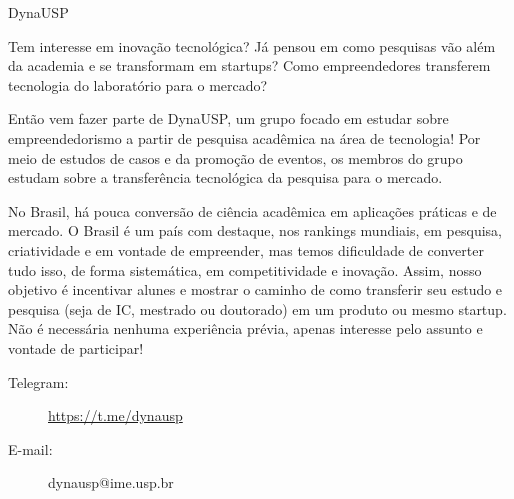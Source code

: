 \begin{subsecao}{DynaUSP}


Tem interesse em inovação tecnológica? Já pensou em como pesquisas
vão além da academia e se transformam em startups? Como empreendedores
transferem tecnologia do laboratório para o mercado? 

Então vem fazer parte de DynaUSP, um grupo focado em estudar sobre
empreendedorismo a partir de pesquisa acadêmica na área de tecnologia!
Por meio de estudos de casos e da promoção de eventos, os membros do grupo
estudam sobre a transferência tecnológica da pesquisa para o mercado.

No Brasil, há pouca conversão de ciência acadêmica em aplicações práticas e
de mercado. O Brasil é um país com destaque, nos rankings mundiais, em pesquisa,
criatividade e em vontade de empreender, mas temos dificuldade de converter tudo
isso, de forma sistemática, em competitividade e inovação. Assim, nosso objetivo
é incentivar alunes e mostrar o caminho de como transferir seu estudo e pesquisa
(seja de IC, mestrado ou doutorado) em um produto ou mesmo startup.  Não é
necessária nenhuma experiência prévia, apenas interesse pelo assunto e vontade
de participar!

\begin{description}
  \item[Telegram:] \url{https://t.me/dynausp}
  \item[E-mail:] dynausp@ime.usp.br
\end{description}

\end{subsecao}
